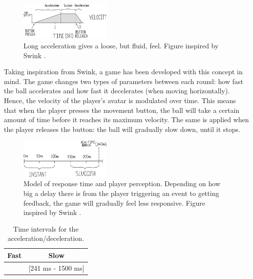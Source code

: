 \begin{figure}[htbp]
\centering
\includegraphics[width=0.40\textwidth]{Pics/adsr_loose}
\caption{Long acceleration gives a loose, but fluid, feel. Figure inspired by Swink \cite{swink}.}
\label{fig:adsr_loose}
\end{figure}

Taking inspiration from Swink, a game has been developed with this concept in mind. The game changes two types of parameters between each round: how fast the ball accelerates and how fast it decelerates (when moving horizontally). Hence, the velocity of the player's avatar is modulated over time. This means that when the player presses the movement button, the ball will take a certain amount of time before it reaches its maximum velocity. The same is applied when the player releases the button: the ball will gradually slow down, until it stops.


\begin{figure}[htbp]
\centering
\includegraphics[width=0.40\textwidth]{Pics/response}
\caption{Model of response time and player perception. Depending on how big a delay there is from the player triggering an event to getting feedback, the game will gradually feel less responsive. Figure inspired by Swink \cite{swink}.}
\label{fig:response}
\end{figure}

\begin{table}[htbp]
\centering
\begin{tabular}{|c|c|}
\hline \textbf{Fast}
& \textbf{Slow}\\\hline
[1 ms - 240 ms]
& [241 ms - 1500 ms]
\\\hline
\end{tabular}
\caption{Time intervals for the acceleration/deceleration.}
\label{tab:time}
\end{table}

